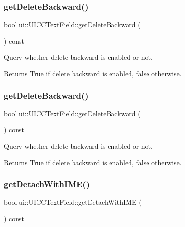 \subsubsection{\texorpdfstring{get\+Delete\+Backward()}{getDeleteBackward()}\hspace{0.1cm}{\footnotesize\ttfamily [1/2]}}
{\footnotesize\ttfamily bool ui\+::\+U\+I\+C\+C\+Text\+Field\+::get\+Delete\+Backward (\begin{DoxyParamCaption}{ }\end{DoxyParamCaption}) const}



Query whether delete backward is enabled or not. 

\begin{DoxyReturn}{Returns}
True if delete backward is enabled, false otherwise. 
\end{DoxyReturn}
\mbox{\label{classui_1_1UICCTextField_a1fa647f6e2272f11dfb6d1a5bb1e2b7c}} 
\subsubsection{\texorpdfstring{get\+Delete\+Backward()}{getDeleteBackward()}\hspace{0.1cm}{\footnotesize\ttfamily [2/2]}}
{\footnotesize\ttfamily bool ui\+::\+U\+I\+C\+C\+Text\+Field\+::get\+Delete\+Backward (\begin{DoxyParamCaption}{ }\end{DoxyParamCaption}) const}



Query whether delete backward is enabled or not. 

\begin{DoxyReturn}{Returns}
True if delete backward is enabled, false otherwise. 
\end{DoxyReturn}
\mbox{\label{classui_1_1UICCTextField_a834dc8e546abd0b02437018e97bbce71}} 
\subsubsection{\texorpdfstring{get\+Detach\+With\+I\+M\+E()}{getDetachWithIME()}\hspace{0.1cm}{\footnotesize\ttfamily [1/2]}}
{\footnotesize\ttfamily bool ui\+::\+U\+I\+C\+C\+Text\+Field\+::get\+Detach\+With\+I\+ME (\begin{DoxyParamCaption}{ }\end{DoxyParamCaption}) const}



